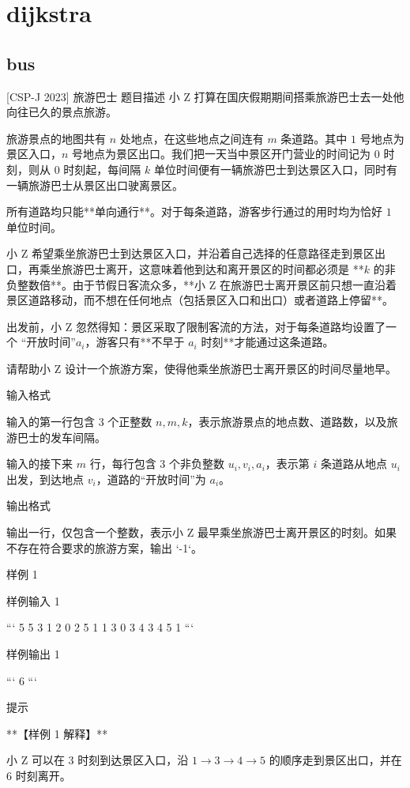 \documentclass[12pt,twiside,a4paper]{ctexbook}
\numberwithin{chapter}{part}
\begin{document}
\chapter{dijkstra}
\section{bus}
 [CSP-J 2023] 旅游巴士
 题目描述
小 Z 打算在国庆假期期间搭乘旅游巴士去一处他向往已久的景点旅游。

旅游景点的地图共有 $n$ 处地点，在这些地点之间连有 $m$ 条道路。其中 $1$ 号地点为景区入口，$n$ 号地点为景区出口。我们把一天当中景区开门营业的时间记为 $0$ 时刻，则从 $0$ 时刻起，每间隔 $k$ 单位时间便有一辆旅游巴士到达景区入口，同时有一辆旅游巴士从景区出口驶离景区。

所有道路均只能**单向通行**。对于每条道路，游客步行通过的用时均为恰好 $1$ 单位时间。

小 Z 希望乘坐旅游巴士到达景区入口，并沿着自己选择的任意路径走到景区出口，再乘坐旅游巴士离开，这意味着他到达和离开景区的时间都必须是 **$k$ 的非负整数倍**。由于节假日客流众多，**小 Z 在旅游巴士离开景区前只想一直沿着景区道路移动，而不想在任何地点（包括景区入口和出口）或者道路上停留**。

出发前，小 Z 忽然得知：景区采取了限制客流的方法，对于每条道路均设置了一个
“开放时间”$a _ i$，游客只有**不早于 $a _ i$ 时刻**才能通过这条道路。

请帮助小 Z 设计一个旅游方案，使得他乘坐旅游巴士离开景区的时间尽量地早。

 输入格式

输入的第一行包含 3 个正整数 $n, m, k$，表示旅游景点的地点数、道路数，以及旅游巴士的发车间隔。

输入的接下来 $m$ 行，每行包含 3 个非负整数 $u _ i, v _ i, a_ i$，表示第 $i$ 条道路从地点 $u _ i$ 出发，到达地点 $v _ i$，道路的“开放时间”为 $a _ i$。

 输出格式

输出一行，仅包含一个整数，表示小 Z 最早乘坐旅游巴士离开景区的时刻。如果不存在符合要求的旅游方案，输出 `-1`。

 样例 1

 样例输入 1

```
5 5 3
1 2 0
2 5 1
1 3 0
3 4 3
4 5 1
```

 样例输出 1

```
6
```

 提示

**【样例 1 解释】**

小 Z 可以在 $3$ 时刻到达景区入口，沿 $1 \to 3 \to 4 \to 5$ 的顺序走到景区出口，并在 $6$ 时刻离开。
\end{document}
